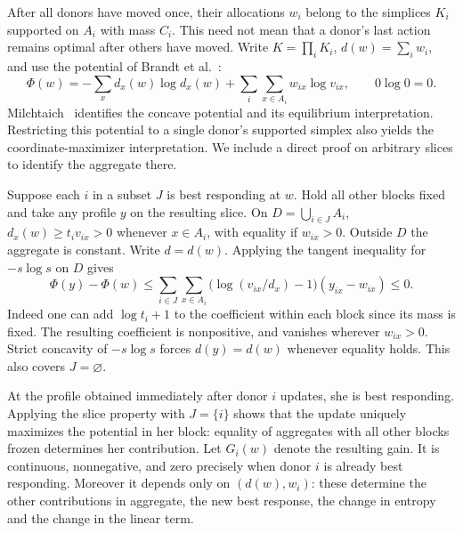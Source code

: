 \documentclass[11pt,a4paper]{amsart}
\begin{document}
After all donors have moved once, their allocations $w_i$ belong to the simplices $K_i$ supported on $A_i$ with mass $C_i$. This need not mean that a donor's last action remains optimal after others have moved. Write $K=\prod_i K_i$, $d(w)=\sum_i w_i$, and use the potential of Brandt et al.~\cite[Eq.~(5)]{brandt}:
\[
 \Phi(w)=-\sum_x d_x(w)\log d_x(w)+\sum_i\sum_{x\in A_i}w_{ix}\log v_{ix},
 \qquad 0\log0=0 .
\]
Milchtaich~\cite[Example 9]{milchtaich} identifies the concave potential and its equilibrium interpretation. Restricting this potential to a single donor's supported simplex also yields the coordinate-maximizer interpretation. We include a direct proof on arbitrary slices to identify the aggregate there.

Suppose each $i$ in a subset $J$ is best responding at $w$. Hold all other blocks fixed and take any profile $y$ on the resulting slice. On $D=\bigcup_{i\in J}A_i$, $d_x(w)\ge t_i v_{ix}>0$ whenever $x\in A_i$, with equality if $w_{ix}>0$. Outside $D$ the aggregate is constant. Write $d=d(w)$. Applying the tangent inequality for $-s\log s$ on $D$ gives
\[
 \Phi(y)-\Phi(w)\le
 \sum_{i\in J}\sum_{x\in A_i}
 \bigl(\log(v_{ix}/d_x)-1\bigr)(y_{ix}-w_{ix})\le 0 .
\]
Indeed one can add $\log t_i+1$ to the coefficient within each block since its mass is fixed. The resulting coefficient is nonpositive, and vanishes wherever $w_{ix}>0$. Strict concavity of $-s\log s$ forces $d(y)=d(w)$ whenever equality holds. This also covers $J=\varnothing$.

At the profile obtained immediately after donor $i$ updates, she is best responding. Applying the slice property with $J=\{i\}$ shows that the update uniquely maximizes the potential in her block: equality of aggregates with all other blocks frozen determines her contribution. Let $G_i(w)$ denote the resulting gain. It is continuous, nonnegative, and zero precisely when donor $i$ is already best responding. Moreover it depends only on $(d(w),w_i)$: these determine the other contributions in aggregate, the new best response, the change in entropy and the change in the linear term.
\end{document}
